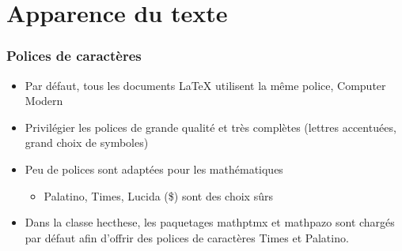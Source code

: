 \section{Apparence du texte}


\begin{frame}[c]

	\frametitle{Polices de caractères}
	
	\begin{itemize}
		\item Par défaut, tous les documents {\LaTeX} utilisent la même police,
			\textrm{Computer Modern}
		\item Privilégier les polices de grande qualité et très complètes (lettres accentuées, grand 	choix de symboles)
		\item Peu de polices sont adaptées pour les mathématiques
			\begin{itemize}
				\item Palatino, Times, Lucida (\$) sont des choix sûrs
			\end{itemize}
		\item Dans la classe hecthese, les paquetages mathptmx et mathpazo sont chargés par défaut
			afin d'offrir des polices de caractères Times et Palatino.
	\end{itemize}
\end{frame}


